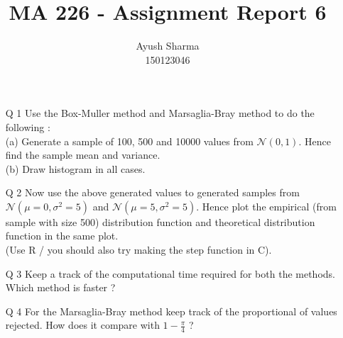 \documentclass[11pt]{article}
\title{MA 226 - Assignment Report 6}
\author{Ayush Sharma\\150123046}
\begin{document}
\titlepage
\newpage

\begin{enumerate}
\item[Q 1] Use the Box-Muller method and Marsaglia-Bray method to do the following :\\
(a) Generate a sample of 100, 500 and 10000 values from $\mathcal{N}(0, 1)$. Hence find the sample mean and variance.\\
(b) Draw histogram in all cases.

\item[Q 2] Now use the above generated values to generated samples from $\mathcal{N}(\mu = 0, \sigma^2 = 5)$ and $\mathcal{N}(\mu = 5, \sigma^2 = 5)$.
Hence plot the empirical (from sample with size 500) distribution function and theoretical distribution function in the same plot.\\
(Use R / you should also try making the step function in C).

\item[Q 3] Keep a track of the computational time required for both the methods. Which method is faster ?

\item[Q 4] For the Marsaglia-Bray method keep track of the proportional of values rejected.
How does it compare with $1-\frac{\pi}{4}$ ?
\end{enumerate}
\newpage
{}
\end{document}
